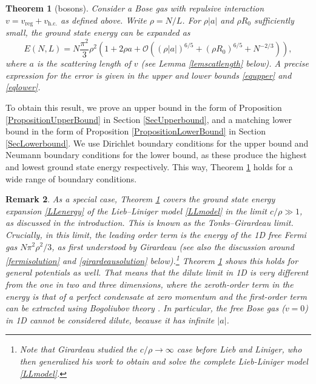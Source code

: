 \documentclass[a4paper,11pt]{article}
\newtheorem{theorem}{Theorem}
\newtheorem{remark}[theorem]{Remark}
\numberwithin{equation}{section}
\begin{document}
	\begin{theorem}[bosons]
		\label{TheoremMain}
		Consider a Bose gas with repulsive interaction  $v=v_{\text{reg}}+v_{\text{h.c.}}$ as defined above. Write $\rho=N/L$. For $\rho|a|$ and $\rho R_0$ sufficiently small, the ground state energy can be expanded as 
		\begin{equation}
			\label{result}
			E(N,L)=N\frac{\pi^2}{3}\rho^2\left(1+2\rho a+
			\mathcal{O}
			\left((\rho|a|)^{6/5}+(\rho R_0)^{6/5}+N^{-2/3}\right)\right),
		\end{equation}
		where $a$ is the scattering length of $v$ (see Lemma \ref{lemscatlength} below). A precise expression for the error is given in the upper and lower bounds \eqref{equpper} and \eqref{eqlower}.
	\end{theorem}
	To obtain this result, we prove an upper bound in the form of Proposition \ref{PropositionUpperBound} in Section \ref{SecUpperbound}, and a matching lower bound in the form of Proposition \ref{PropositionLowerBound} in Section \ref{SecLowerbound}. We use Dirichlet boundary conditions for the upper bound and Neumann boundary conditions for the lower bound, as these produce the highest and lowest ground state energy respectively. This way, Theorem \ref{TheoremMain} holds for a wide range of boundary conditions. 
	
	\begin{remark}
		\label{remfermi}
		As a special case, Theorem \ref{TheoremMain} covers the ground state energy expansion \eqref{LLenergy} of the Lieb--Liniger model \eqref{LLmodel} in the limit $c/\rho\gg1$, as discussed in the introduction. This is known as the Tonks--Girardeau limit. Crucially, in this limit, the leading order term is the energy of the 1D free Fermi gas $N\pi^2\rho^2/3$, as first understood by Girardeau \cite{girardeau1960relationship} (see also the discussion around \eqref{fermisolution} and \eqref{girardeausolution} below).\footnote{Note that Girardeau studied the $c/\rho\to\infty$ case before Lieb and Liniger, who then generalized his work to obtain and solve the complete Lieb-Liniger model \eqref{LLmodel}.} Theorem \ref{TheoremMain} shows this holds for general potentials as well. That means that the dilute limit in 1D is very different from the one in two and three dimensions, where the zeroth-order term in the energy is that of a perfect condensate at zero momentum and the first-order term can be extracted using Bogoliubov theory \cite{bogoliubov1947theory}. In particular, the free Bose gas ($v=0$) in 1D cannot be considered dilute, because it has infinite $|a|$.  
	\end{remark}
	
\end{document}
